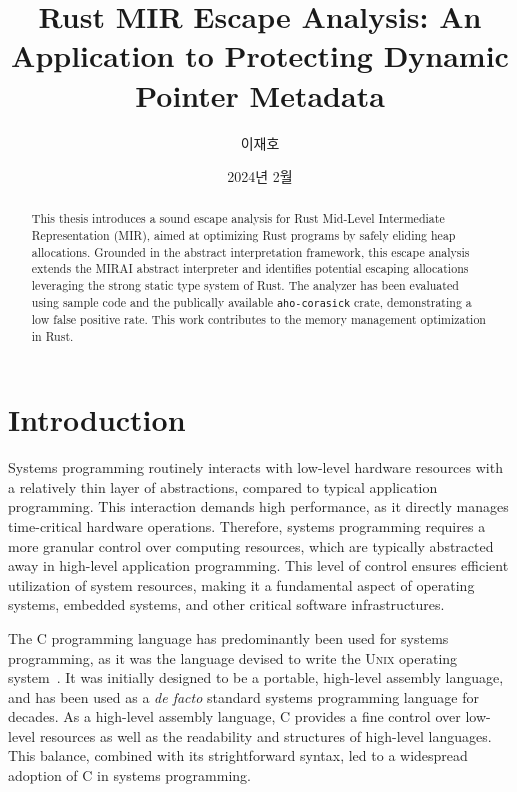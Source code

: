 \documentclass[en]{snu-ece-bsc-thesis}
\title{Rust MIR Escape Analysis: An Application to Protecting Dynamic Pointer Metadata}
\author{이재호}
\date{2024년 2월}
\theoremstyle{definition}
\begin{document}
\maketitle

\begin{abstract}
  This thesis introduces a sound escape analysis for Rust Mid-Level Intermediate Representation (MIR), aimed at optimizing Rust programs by safely eliding heap allocations.
  Grounded in the abstract interpretation framework, this escape analysis extends the MIRAI abstract interpreter and identifies potential escaping allocations leveraging the strong static type system of Rust.
  The analyzer has been evaluated using sample code and the publically available \texttt{aho-corasick} crate, demonstrating a low false positive rate.
  This work contributes to the memory management optimization in Rust.
\end{abstract}


\tableofcontents
\listoffigures


\chapter{Introduction}\label{chap:introduction}

Systems programming routinely interacts with low-level hardware resources with a relatively thin layer of abstractions, compared to typical application programming.
This interaction demands high performance, as it directly manages time-critical hardware operations.
Therefore, systems programming requires a more granular control over computing resources, which are typically abstracted away in high-level application programming.
This level of control ensures efficient utilization of system resources, making it a fundamental aspect of operating systems, embedded systems, and other critical software infrastructures.

The C programming language has predominantly been used for systems programming, as it was the language devised to write the \textsc{Unix} operating system~\cite{k&r}.
It was initially designed to be a portable, high-level assembly language, and has been used as a \textit{de facto} standard systems programming language for decades.
As a high-level assembly language, C provides a fine control over low-level resources as well as the readability and structures of high-level languages.
This balance, combined with its strightforward syntax, led to a widespread adoption of C in systems programming.
\end{document}
